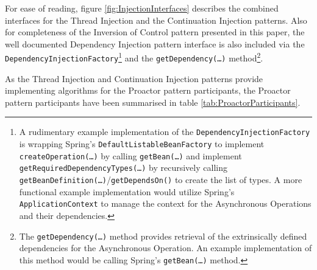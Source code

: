 \documentclass[prodmode]{style/acmlarge}
\begin{document}
For ease of reading, figure \ref{fig:InjectionInterfaces} describes the combined
interfaces for the Thread Injection and the Continuation Injection patterns.
Also for completeness of the Inversion of Control pattern presented in this
paper, the well documented Dependency Injection pattern \cite{ioc} interface is
also included via the \texttt{DependencyInjectionFactory}\footnote{A rudimentary
example implementation of the \texttt{DependencyInjectionFactory} is wrapping
Spring's \cite{spring} \texttt{DefaultListableBeanFactory} to implement
\texttt{createOperation(\ldots)} by calling \texttt{getBean(\ldots)} and
implement \texttt{getRequiredDependencyTypes(\ldots)} by recursively calling
\texttt{getBeanDefinition(\ldots)}/\texttt{getDependsOn()} to create the list of
types.  A more functional example implementation would utilize Spring's
\texttt{ApplicationContext} to manage the context for the Asynchronous
Operations and their dependencies.} and the \texttt{getDependency(\ldots)}
method\footnote{The \texttt{getDependency(\ldots)} method provides retrieval of
the extrinsically defined dependencies for the Asynchronous Operation.  An
example implementation of this method would be calling Spring's \cite{spring}
\texttt{getBean(\ldots)} method.}.


As the Thread Injection and Continuation Injection patterns provide implementing
algorithms for the Proactor pattern participants, the Proactor pattern
participants have been summarised in table \ref{tab:ProactorParticipants}.

\begin{table}[t]
\label{tab:ProactorParticipants}
\end{table}
\end{document}
